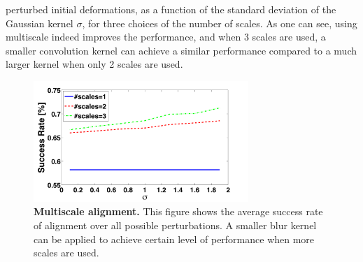 \documentclass[12pt,journal,draftcls,letterpaper,onecolumn]{IEEEtran}
\begin{document}
perturbed initial deformations, as a function of the
standard deviation of the Gaussian kernel $\sigma$, for
three choices of the number of scales. As one can see,
using multiscale indeed improves the performance, and when
3 scales are used, a smaller convolution kernel can achieve
a similar performance compared to a much larger kernel when
only 2 scales are used.
\begin{figure}
\centering
\includegraphics[height=1.8in]{figures_pami/multiscale.png}
\caption{{\bf Multiscale alignment.} This figure shows the average success rate of alignment over all possible perturbations. A smaller blur kernel can be applied to achieve certain level of performance when more scales are used.}
\label{fig:multiscale}
\vspace{-.2in}
\end{figure}
\end{document}
